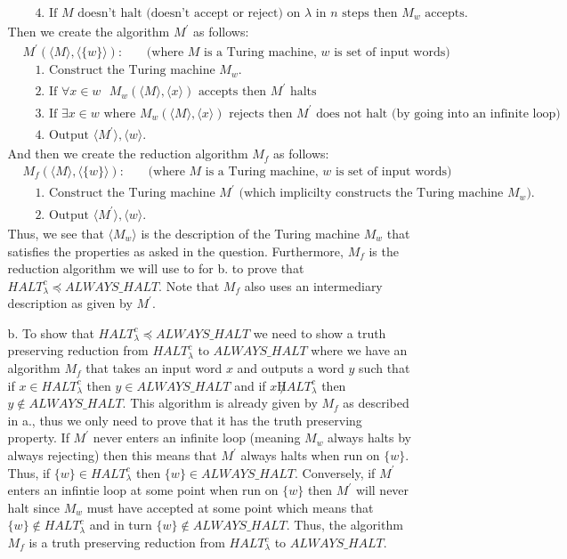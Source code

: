 \documentclass [10pt]{article}
\newcommand{\reduces}{\preceq}%
\begin{document}
\begin{enumerate}
\begin{enumerate}
\begin{align}
			&\quad\text{4. If $M$ doesn't halt (doesn't accept or reject) on $\lambda$ in $n$ steps then $M_{w}$ accepts.}\nonumber
		\end{align}
		Then we create the algorithm $M^{\prime}$ as follows:
		\begin{align}
			&\text{$M^{\prime}(\langle M\rangle,\langle \{w\}\rangle)$:}\qquad\text{(where $M$ is a Turing machine, $w$ is set of input words)}\nonumber\\
			&\quad\text{1. Construct the Turing machine $M_{w}$.}\nonumber\\
			&\quad\text{2. If $\forall x\in w$ $M_w(\langle M\rangle,\langle x\rangle)$ accepts then $M^{\prime}$ halts}\nonumber\\
			&\quad\text{3. If $\exists x\in w$ where $M_w(\langle M\rangle,\langle x\rangle)$ rejects then $M^{\prime}$ does not halt (by going into an infinite loop)}\nonumber\\
			&\quad\text{4. Output $\langle M^{\prime}\rangle, \langle w\rangle$.}\nonumber
		\end{align}
		And then we create the reduction algorithm $M_{f}$ as follows:
		\begin{align}
			&\text{$M_{f}(\langle M\rangle,\langle \{w\}\rangle)$:}\qquad\text{(where $M$ is a Turing machine, $w$ is set of input words)}\nonumber\\
			&\quad\text{1. Construct the Turing machine $M^{\prime}$ (which implicilty constructs the Turing machine $M_{w}$).}\nonumber\\
			&\quad\text{2. Output $\langle M^{\prime}\rangle, \langle w\rangle$.}\nonumber
		\end{align}
		Thus, we see that $\langle M_{w}\rangle$ is the description of the Turing machine $M_{w}$ that satisfies the properties as asked in the question. Furthermore, $M_{f}$ is the reduction algorithm we will use to for b. to prove that $HALT_{\lambda}^{c}\reduces ALWAYS\_HALT$. Note that $M_{f}$ also uses an intermediary description as given by $M^{\prime}$.
		\item[b.]To show that $HALT_{\lambda}^{c}\reduces ALWAYS\_HALT$ we need to show a truth preserving reduction from $HALT_{\lambda}^{c}$ to $ALWAYS\_HALT$ where we have an algorithm $M_{f}$ that takes an input word $x$ and outputs a word $y$ such that if $x\in HALT_{\lambda}^{c}$ then $y\in ALWAYS\_HALT$ and if $x\not HALT_{\lambda}^{c}$ then $y\notin ALWAYS\_HALT$. This algorithm is already given by $M_{f}$ as described in a., thus we only need to prove that it has the truth preserving property. If $M^{\prime}$ never enters an infinite loop (meaning $M_{w}$ always halts by always rejecting) then this means that $M^{\prime}$ always halts when run on $\{w\}$. Thus, if $\{w\}\in HALT_{\lambda}^{c}$ then $\{w\}\in ALWAYS\_HALT$. Conversely, if $M^{\prime}$ enters an infintie loop at some point when run on $\{w\}$ then $M^{\prime}$ will never halt since $M_{w}$ must have accepted at some point which means that $\{w\}\notin HALT_{\lambda}^{c}$ and in turn $\{w\}\notin ALWAYS\_HALT$. Thus, the algorithm $M_{f}$ is a truth preserving reduction from $HALT_{\lambda}^{c}$ to $ALWAYS\_HALT$.

\end{enumerate}
\end{enumerate}
\end{document}
